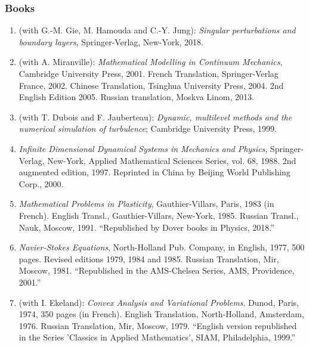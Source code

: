 \documentclass{article}
\begin{document}
\subsubsection{Books}
\begin{enumerate}
	\item (with G.-M. Gie, M. Hamouda and C.-Y. Jung): \textit{Singular perturbations and boundary layers}, Springer-Verlag, New-York, 2018.
	\item (with A. Miranville): \textit{Mathematical Modelling in Continuum Mechanics}, Cambridge University Press, 2001. French Translation, Springer-Verlag France, 2002. Chinese Translation, Tsinghua University Press, 2004. 2nd English Edition 2005. Russian translation, Moskva Linom, 2013.
	\item (with T. Dubois and F. Jauberteau): \textit{Dynamic, multilevel methods and the numerical simulation of turbulence}; Cambridge University Press, 1999.
	\item \textit{Infinite Dimensional Dynamical Systems in Mechanics and Physics}, Springer-Verlag, New-York, Applied Mathematical Sciences Series, vol. 68, 1988. 2nd augmented edition, 1997. Reprinted in China by Beijing World Publishing Corp., 2000.
	\item \textit{Mathematical Problems in Plasticity}, Gauthier-Villars, Paris, 1983 (in French). English Transl., Gauthier-Villars, New-York, 1985. Russian Transl., Nauk, Moscow, 1991. ``Republished by Dover books in Physics, 2018.''
	\item \textit{Navier-Stokes Equations}, North-Holland Pub. Company, in English, 1977, 500 pages. Revised editions 1979, 1984 and 1985. Russian Translation, Mir, Moscow, 1981. ``Republished in the AMS-Chelsea Series, AMS, Providence, 2001.''
	\item (with I. Ekeland): \textit{Convex Analysis and Variational Problems}. Dunod, Paris, 1974, 350 pages (in French). English Translation, North-Holland, Amsterdam, 1976. Russian Translation, Mir, Moscow, 1979. ``English version republished in the Series 'Classics in Applied Mathematics', SIAM, Philadelphia, 1999.''
\end{enumerate}
\end{document}
